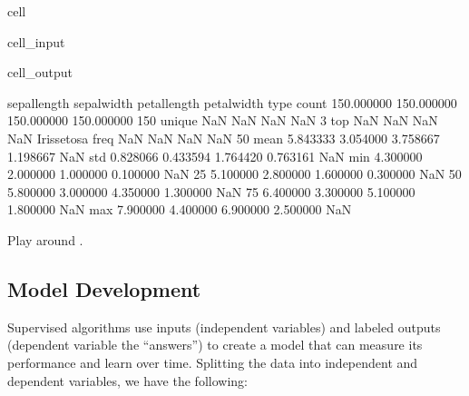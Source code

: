 \documentclass[letterpaper,10pt,english]{jupyterBook}
\begin{document}
\begin{sphinxuseclass}{cell}\begin{sphinxVerbatimInput}

\begin{sphinxuseclass}{cell_input}
\begin{sphinxVerbatim}[commandchars=\\\{\}]
\end{sphinxVerbatim}

\end{sphinxuseclass}\end{sphinxVerbatimInput}
\begin{sphinxVerbatimOutput}

\begin{sphinxuseclass}{cell_output}
\begin{sphinxVerbatim}[commandchars=\\\{\}]
        sepal\PYGZhy{}length  sepal\PYGZhy{}width  petal\PYGZhy{}length  petal\PYGZhy{}width         type
count     150.000000   150.000000    150.000000   150.000000          150
unique           NaN          NaN           NaN          NaN            3
top              NaN          NaN           NaN          NaN  Iris\PYGZhy{}setosa
freq             NaN          NaN           NaN          NaN           50
mean        5.843333     3.054000      3.758667     1.198667          NaN
std         0.828066     0.433594      1.764420     0.763161          NaN
min         4.300000     2.000000      1.000000     0.100000          NaN
25\PYGZpc{}         5.100000     2.800000      1.600000     0.300000          NaN
50\PYGZpc{}         5.800000     3.000000      4.350000     1.300000          NaN
75\PYGZpc{}         6.400000     3.300000      5.100000     1.800000          NaN
max         7.900000     4.400000      6.900000     2.500000          NaN
\end{sphinxVerbatim}

\end{sphinxuseclass}\end{sphinxVerbatimOutput}

\end{sphinxuseclass}
\sphinxAtStartPar
Play around \sphinxhyphen{}.

\sphinxstepscope


\subsection{Model Development}
\label{\detokenize{task2_c/example_sup_class/sup_class_ex-develop:model-development}}\label{\detokenize{task2_c/example_sup_class/sup_class_ex-develop:sup-class-ex-develop}}\label{\detokenize{task2_c/example_sup_class/sup_class_ex-develop::doc}}
\sphinxAtStartPar
Supervised algorithms use inputs (independent variables) and labeled outputs (dependent variable \sphinxhyphen{}the “answers”) to create a model that can measure its performance and learn over time. Splitting the data into independent and dependent variables, we have the following:
\end{document}
